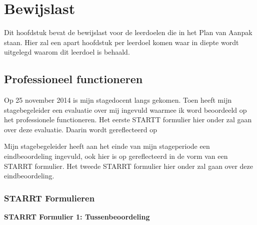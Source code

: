 \section{Bewijslast}
Dit hoofdstuk bevat de bewijslast voor de leerdoelen die in het Plan van Aanpak staan. Hier zal een apart hoofdstuk per leerdoel komen waar in diepte wordt uitgelegd waarom dit leerdoel is behaald.

\subsection{Professioneel functioneren}
Op 25 november 2014 is mijn stagedocent langs gekomen. Toen heeft mijn stagebegeleider een evaluatie over mij ingevuld waarmee ik word beoordeeld op het professionele functioneren. Het eerste STARTT formulier hier onder zal gaan over deze evaluatie. Daarin wordt gereflecteerd op

\newline
Mijn stagebegeleider heeft aan het einde van mijn stageperiode een eindbeoordeling ingevuld, ook hier is op gereflecteerd in de vorm van een STARRT formulier. Het tweede STARRT formulier hier onder zal gaan over deze eindbeoordeling.

\subsubsection{STARRT Formulieren}

\textbf{STARRT Formulier 1: Tussenbeoordeling}

